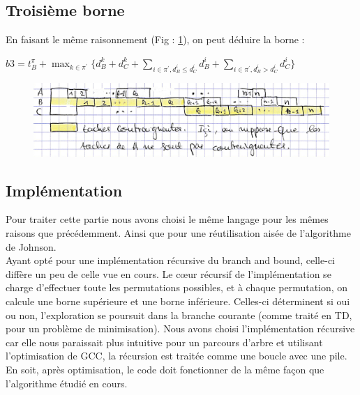 \documentclass[12pt]{article}
\begin{document}
\subsection{Troisième borne}

En faisant le même raisonnement (Fig : \ref{cas41}), on peut déduire la borne :\\


\begin{center}
 $b3 = t_B^\pi + \displaystyle\max_{k \in \pi^\prime}\{d_B^k + d_C^k + \displaystyle\sum_{i \in \pi^\prime,d_B^i \le d_C^i} d_B^i + \displaystyle\sum_{i \in \pi^\prime,d_B^i > d_C^i} d_C^i\} $\\
\end{center}

\begin{figure}[!ht]
\centering
\centerline{\includegraphics[scale=1]{11.jpg}}
\caption{}
\label{cas41}
\end{figure}

\subsection{Implémentation}

Pour traiter cette partie nous avons choisi le même langage pour les mêmes raisons que précédemment. Ainsi que pour une réutilisation aisée de l'algorithme de Johnson.\\

Ayant opté pour une implémentation récursive du branch and bound, celle-ci diffère un peu de celle vue en cours. Le cœur récursif de l'implémentation se charge d'effectuer toute les permutations possibles, et à chaque permutation, on calcule une borne supérieure et une borne inférieure. Celles-ci déterminent si oui ou non, l'exploration se poursuit dans la branche courante (comme traité en TD, pour un problème de minimisation). Nous avons choisi l'implémentation récursive car elle nous paraissait plus intuitive pour un parcours d'arbre et utilisant l'optimisation de GCC, la récursion est traitée comme une boucle avec une pile. En soit, après optimisation, le code doit fonctionner de la même façon que l'algorithme étudié en cours. 
\end{document}

